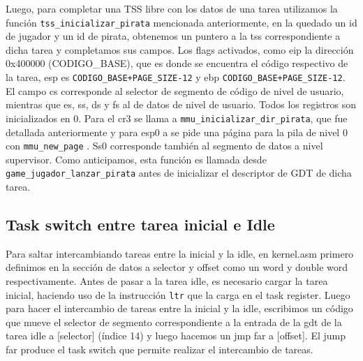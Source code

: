 Luego, para completar una TSS libre con los datos de una tarea utilizamos la función \texttt{tss\_inicializar\_pirata} mencionada anteriormente, en la quedado un id de jugador y un id de pirata, obtenemos un puntero a la tss correspondiente a dicha tarea y completamos sus campos. Los flags activados, como eip la dirección 0x400000 (CODIGO\_BASE), que es donde se encuentra el código respectivo de la tarea, esp es \texttt{CODIGO\_BASE+PAGE\_SIZE-12} y ebp \texttt{CODIGO\_BASE+PAGE\_SIZE-12}. El campo cs corresponde al selector de segmento de código de nivel de usuario, mientras que es, ss, ds y fs al de datos de nivel de usuario. Todos los registros son inicializados en 0. 
Para el cr3 se llama a \texttt{mmu\_inicializar\_dir\_pirata}, que fue detallada anteriormente y para  esp0 a  se pide una página para la pila de nivel 0 con \texttt{mmu\_new\_page} . Ss0 corresponde también al segmento de datos a nivel supervisor. Como anticipamos, esta función es llamada desde \texttt{game\_jugador\_lanzar_pirata} antes de inicializar el descriptor de GDT de dicha tarea.

\subsection{Task switch entre tarea inicial e Idle}

Para saltar intercambiando tareas entre la inicial y la idle, en kernel.asm primero definimos en la sección de datos a selector y offset como un word y double word respectivamente.
Antes de pasar a la tarea idle, es necesario cargar la tarea inicial, haciendo uso de la instrucción \texttt{ltr} que la carga en el task register.
Luego para hacer el intercambio de tareas entre la inicial y la idle, escribimos un código que mueve el selector de segmento correspondiente a la entrada de la gdt de la tarea idle a [selector] (índice 14) y luego hacemos un jmp far a [offset]. El jump far produce el task switch que permite realizar el intercambio de tareas.

